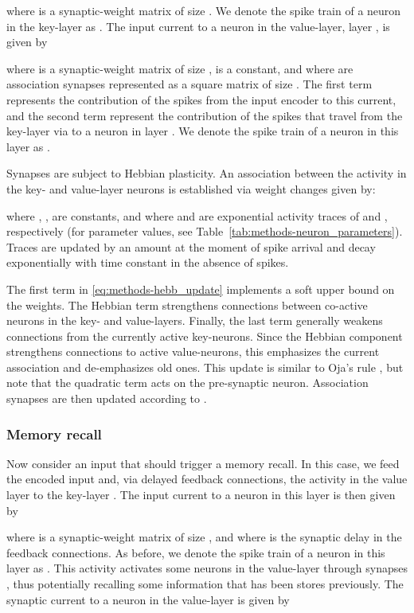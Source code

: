 \documentclass{article}
\begin{document}
where  is a synaptic-weight matrix of size . We denote the spike train of a neuron  in the key-layer as . The input current to a neuron  in the value-layer, layer , is given by

where  is a synaptic-weight matrix of size ,  is a constant, and where  are association synapses represented as a square matrix of size . The first term represents the contribution of the spikes from the input encoder to this current, and the second term represent the contribution of the spikes that travel from the key-layer via  to a neuron in layer . We denote the spike train of a neuron  in this layer as .

Synapses  are subject to Hebbian plasticity. An association between the activity in the key- and value-layer neurons is established via weight changes given by:

where , ,  are constants, and where  and  are exponential activity traces of  and , respectively (for parameter values, see Table~\ref{tab:methods-neuron_parameters}). Traces are updated by an amount  at the moment of spike arrival and decay exponentially with time constant  in the absence of spikes.

The first term in \eqref{eq:methods-hebb_update} implements a soft upper bound  on the weights. The Hebbian term  strengthens connections between co-active neurons in the key- and value-layers. Finally, the last term generally weakens connections from the currently active key-neurons. Since the Hebbian component strengthens connections to active value-neurons, this emphasizes the current association and de-emphasizes old ones. This update is similar to Oja's rule \cite{oja1982simplified}, but note that the quadratic term acts on the pre-synaptic neuron. Association synapses are then updated according to .

\subsubsection{Memory recall}
Now consider an input that should trigger a memory recall. In this case, we feed the encoded input  and, via delayed feedback connections, the activity in the value layer  to the key-layer . The input current to a neuron  in this layer is then given by

where  is a synaptic-weight matrix of size , and where  is the synaptic delay in the feedback connections. As before, we denote the spike train of a neuron  in this layer as . This activity activates some neurons in the value-layer through synapses , thus potentially recalling some information that has been stores previously. The synaptic current to a neuron  in the value-layer is given by
\end{document}
